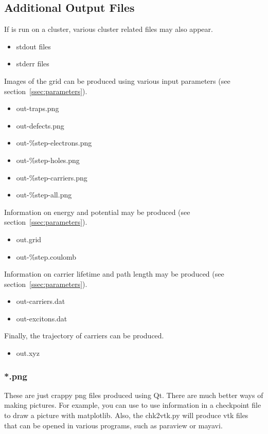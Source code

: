 \subsection{Additional Output Files}
    If \Langmuir is run on a cluster, various cluster related files may also appear.
    \begin{itemize}
        \item stdout files
        \item stderr files
    \end{itemize}
    Images of the grid can be produced using various input parameters
        (see section~\ref{ssec:parameters}).
    \begin{itemize}
        \item out-traps.png
        \item out-defects.png
        \item out-\%step-electrons.png
        \item out-\%step-holes.png
        \item out-\%step-carriers.png
        \item out-\%step-all.png
    \end{itemize}
    Information on energy and potential may be produced
        (see section~\ref{ssec:parameters}).
    \begin{itemize}
        \item out.grid
        \item out-\%step.coulomb
    \end{itemize}
    Information on carrier lifetime and path length may be produced
        (see section~\ref{ssec:parameters}).
    \begin{itemize}
        \item out-carriers.dat
        \item out-excitons.dat
    \end{itemize}
    Finally, the trajectory of carriers can be produced.
    \begin{itemize}
        \item out.xyz
    \end{itemize}
    
    \subsubsection{*.png}
        These are just crappy png files produced using Qt.
        There are much better ways of making pictures.
        For example, you can use \LangmuirPython to use information
            in a checkpoint file to draw a picture with matplotlib.
        Also, the \LangmuirPython chk2vtk.py will produce vtk files that can
            be opened in various programs, such as paraview or mayavi.
    
